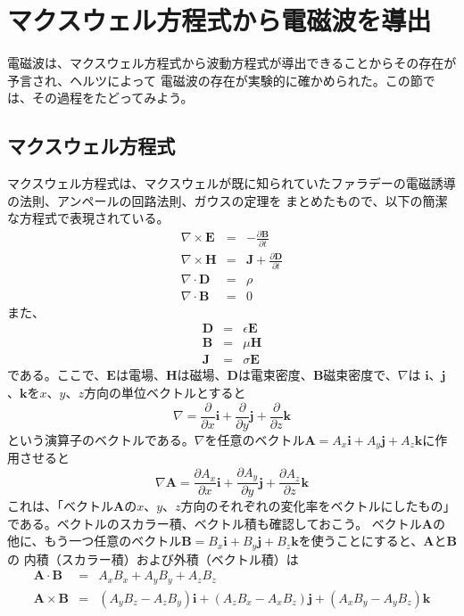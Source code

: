 \section{マクスウェル方程式から電磁波を導出}
電磁波は、マクスウェル方程式から波動方程式が導出できることからその存在が予言され、ヘルツによって
電磁波の存在が実験的に確かめられた。この節では、その過程をたどってみよう。
\subsection{マクスウェル方程式}
マクスウェル方程式は、マクスウェルが既に知られていたファラデーの電磁誘導の法則、アンペールの回路法則、ガウスの定理を
まとめたもので、以下の簡潔な方程式で表現されている。
\begin{eqnarray}
\nabla \times \bm{E} &=& -\frac{\partial \bm{B}}{\partial t} \label{eq:mxwl-E}\\
\nabla \times \bm{H} &=& \bm{J} + \frac{\partial \bm{D}}{\partial t} \label{eq:mxwl-H}\\
\nabla \cdot \bm{D}  &=& \rho \label{eq:mxwl-D}\\
\nabla \cdot \bm{B}  &=& 0 \label{eq:mxwl-B}
\end{eqnarray}
また、
\begin{eqnarray}
\bm{D} &=& \epsilon \bm{E} \label{eq:mxwl-D2}\\
\bm{B} &=& \mu \bm{H} \label{eq:mxwl-B2}\\
\bm{J} &=& \sigma \bm{E} \label{eq:mxwl-J}
\end{eqnarray}
である。ここで、$\bm{E}$は電場、$\bm{H}$は磁場、$\bm{D}$は電束密度、$\bm{B}$磁束密度で、$\nabla$は
$\bm{i}$、$\bm{j}$、$\bm{k}$を$x$、$y$、$z$方向の単位ベクトルとすると
\[
\nabla = \frac{\partial}{\partial x} \bm{i} + \frac{\partial}{\partial y} \bm{j} + \frac{\partial}{\partial z} \bm{k}
\]
という演算子のベクトルである。$\nabla$を任意のベクトル$\bm{A}=A_x\bm{i} + A_y\bm{j} + A_z\bm{k}$に作用させると
\[
\nabla\bm{A} = \frac{\partial A_x}{\partial x} \bm{i} + \frac{\partial A_y}{\partial y} \bm{j} + \frac{\partial A_z}{\partial z} \bm{k}
\]
これは、「ベクトル$\bm{A}$の$x$、$y$、$z$方向のそれぞれの変化率をベクトルにしたもの」である。ベクトルのスカラー積、ベクトル積も確認しておこう。
ベクトル$\bm{A}$の他に、もう一つ任意のベクトル$\bm{B}=B_x\bm{i} + B_y\bm{j} + B_z\bm{k}$を使うことにすると、$\bm{A}$と$\bm{B}$の
内積（スカラー積）および外積（ベクトル積）は
\begin{eqnarray*}
\bm{A} \cdot \bm{B} &=& A_xB_x + A_yB_y + A_zB_z \\
\bm{A}\times\bm{B} &=& (A_yB_z - A_zB_y)\bm{i} + (A_zB_x - A_xB_z)\bm{j} + (A_xB_y - A_yB_z)\bm{k}
\end{eqnarray*}
